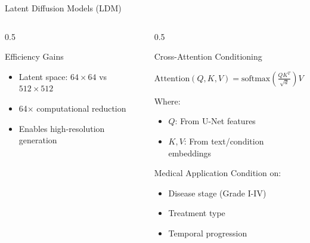 \documentclass[aspectratio=169]{beamer}
\begin{document}
\begin{frame}{Latent Diffusion Models (LDM)}
\begin{columns}
\begin{column}{0.5\textwidth}
            \begin{block}{Efficiency Gains}
                \begin{itemize}
                    \item Latent space: $64 \times 64$ vs $512 \times 512$
                    \item 64$\times$ computational reduction
                    \item Enables high-resolution generation
                \end{itemize}
            \end{block}
        \end{column}
        \begin{column}{0.5\textwidth}
            \begin{block}{Cross-Attention Conditioning}
                \begin{center}
                    $\text{Attention}(Q, K, V) = \text{softmax}\left(\frac{QK^T}{\sqrt{d}}\right)V$
                \end{center}
                Where:
                \begin{itemize}
                    \item $Q$: From U-Net features
                    \item $K, V$: From text/condition embeddings
                \end{itemize}
            \end{block}
            
            \begin{alertblock}{Medical Application}
                Condition on:
                \begin{itemize}
                    \item Disease stage (Grade I-IV)
                    \item Treatment type
                    \item Temporal progression
                \end{itemize}
            \end{alertblock}
        \end{column}
    \end{columns}
\end{frame}
\end{document}
